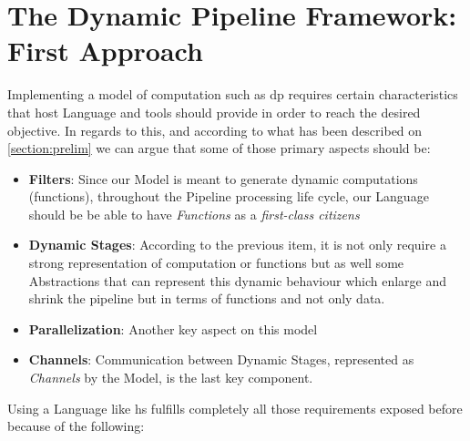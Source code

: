 \documentclass[preprint]{elsarticle}
\begin{document}
\section{The Dynamic Pipeline Framework: First Approach}\label{section:prob:dp:haskell}
Implementing a model of computation such as \acrshort{dp} requires certain characteristics that host Language and tools should provide in order to reach the desired objective. In regards to this, and according to what has been described on \autoref{section:prelim} we can argue that some of those primary aspects should be:

\begin{itemize}
    \item \textbf{Filters}: Since our Model is meant to generate dynamic computations (functions), throughout the Pipeline processing life cycle, our Language should be be able to have \textit{Functions} as a \textit{first-class citizens}
    \item \textbf{Dynamic Stages}: According to the previous item, it is not only require a strong representation of computation or functions but as well some Abstractions that can represent this dynamic behaviour which enlarge and shrink the pipeline but in terms of functions and not only data.
    \item \textbf{Parallelization}: Another key aspect on this model 
    \item \textbf{Channels}: Communication between Dynamic Stages, represented as \textit{Channels} by the Model, is the last key component.
\end{itemize}

Using a Language like \acrshort{hs} fulfills completely all those requirements exposed before because of the following:
\end{document}
